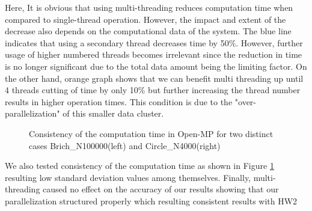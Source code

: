 \documentclass{article}
\begin{document}
Here, It is obvious that using multi-threading reduces computation time when compared to single-thread operation. However, the impact and extent of the decrease also depends on the computational data of the system. The blue line indicates that using a secondary thread decreases time by 50\%. However, further usage of higher numbered threads becomes irrelevant since the reduction in time is no longer significant due to the total data amount being the limiting factor. On the other hand, orange graph shows that we can benefit multi threading up until 4 threads cutting of time by only 10\% but further increasing the thread number results in higher operation times. This condition is due to the "over-parallelization" of this smaller data cluster.

\begin{figure}[htbp]
    \centering
    \caption{Consistency of the computation time in Open-MP for two distinct cases Brich\_N100000(left) and Circle\_N4000(right)}
    \label{fig2}
\end{figure}

We also tested consistency of the computation time as shown in Figure \ref{fig2} resulting low standard deviation values among themselves. Finally, multi-threading caused no effect on the accuracy of our results showing that our parallelization structured properly which resulting consistent results with HW2
\end{document}
